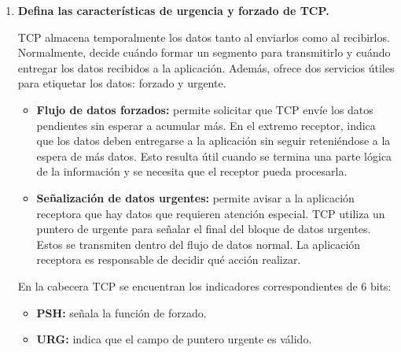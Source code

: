 \documentclass[11pt,a4paper]{article}
\begin{document}
\begin{enumerate}[label=20.\arabic*, start=1, itemsep=0.3cm]
  También un SYN viejo puede llegar después del cierre de una conexión y ser interpretado como una solicitud nueva y se conectan aunque estén esperando números de secuencia distintos.
  Esto se resuelve con el dialogo en tres pasos:
  \begin{enumerate}
    \item A envía un SYN con número de secuencia inicial.
    \item B confirma el SYN de A y envía su propio SYN con número de secuencia inicial propio.
    \item A confirma el SYN de B.
  \end{enumerate}
  El beneficio es que cada extremo confirma explícitamente el SYN y número de secuencia inicial del otro antes de considerarse establecida la conexión. De esta manera evita conexiones incorrectas por la solicitud vieja o duplicada y se asegura sobre los números de secuencia que van a utilizar
  \item \textbf{Defina las características de urgencia y forzado de TCP.}

  TCP almacena temporalmente los datos tanto al enviarlos como al recibirlos. Normalmente, decide cuándo formar un segmento para transmitirlo y cuándo entregar los datos recibidos a la aplicación. Además, ofrece dos servicios útiles para etiquetar los datos: forzado y urgente.

  \begin{itemize}
      \item \textbf{Flujo de datos forzados:} permite solicitar que TCP envíe los datos pendientes sin esperar a acumular más. En el extremo receptor, indica que los datos deben entregarse a la aplicación sin seguir reteniéndose a la espera de más datos. Esto resulta útil cuando se termina una parte lógica de la información y se necesita que el receptor pueda procesarla.

      \item \textbf{Señalización de datos urgentes:} permite avisar a la aplicación receptora que hay datos que requieren atención especial. TCP utiliza un puntero de urgente para señalar el final del bloque de datos urgentes. Estos se transmiten dentro del flujo de datos normal. La aplicación receptora es responsable de decidir qué acción realizar.
  \end{itemize}

  En la cabecera TCP se encuentran los indicadores correspondientes de 6 bits:
  \begin{itemize}
      \item \textbf{PSH:} señala la función de forzado.
      \item \textbf{URG:} indica que el campo de puntero urgente es válido.
  \end{itemize}


\end{enumerate}
\end{document}
